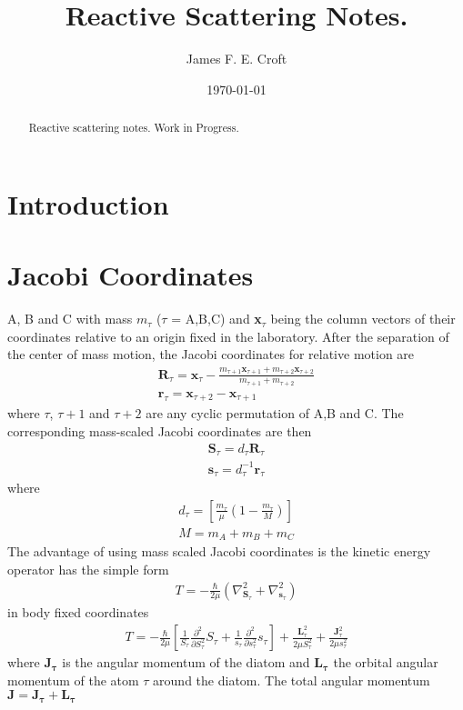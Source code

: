 \documentclass[aps,pra,onecolumn,showpacs,floatfix]{revtex4}
\begin{document}
\title{Reactive Scattering Notes.}
\author{James F. E. Croft}
\affiliation{\noaffiliation}

\date{\today}

\begin{abstract}
Reactive scattering notes. Work in Progress.
\end{abstract}

\pacs{}

\maketitle
%
\section{Introduction}
\section{Jacobi Coordinates}
A, B and C with mass $m_\tau$ ($\tau$ = A,B,C) and \textbf{x}$_\tau$ being the
column vectors of their coordinates relative to an origin fixed in the
laboratory. After the separation of the center of mass motion, the Jacobi
coordinates for relative motion are
\begin{align}\label{eqn:jac}
	\mathbf{R}_\tau = \mathbf{x}_
	\tau-\frac{m_{\tau+1} \mathbf{x}_{\tau+1}+m_{\tau+2} \mathbf{x}_{\tau+2}}{m_{\tau+1} + m_{\tau+2}} \\
	\mathbf{r}_\tau = \mathbf{x}_{\tau+2} - \mathbf{x}_{\tau+1}
\end{align}
where $\tau$, $\tau+1$ and $\tau+2$ are any cyclic permutation of A,B and C. The
corresponding mass-scaled Jacobi coordinates are then
\begin{align}\label{eqn:ms_jac}
	\mathbf{S}_\tau = d_\tau\mathbf{R}_\tau \\
	\mathbf{s}_\tau = d^{-1}_\tau\mathbf{r}_\tau
\end{align}
where
\begin{align}\label{eqn:ms_jac}
d_\tau = \left[\frac{m_\tau}{\mu}\left(1-\frac{m_\tau}{M}\right)\right] \\
M = m_A + m_B + m_C
\end{align}
The advantage of using mass scaled Jacobi coordinates is the kinetic energy
operator has the simple form
\begin{align}\label{eqn:ms_jac}
	T = -\frac{\hbar}{2\mu}(\nabla^2_{\mathbf{S}_\tau} + \nabla^2_{\mathbf{s}_\tau})
\end{align}
in body fixed coordinates
\begin{align}\label{eqn:ms_jac}
	T = -\frac{\hbar}{2\mu}\left[\frac{1}{S_\tau}\frac{\partial^2}{\partial S^2_\tau}S_\tau + \frac{1}{s_\tau}\frac{\partial^2}{\partial s^2_\tau}s_\tau\right] +
	\frac{\mathbf{L}^2_\tau}{2\mu S^2_\tau} + \frac{\mathbf{J}^2_\tau}{2\mu s^2_\tau}
\end{align}
where $\mathbf{J_\tau}$ is the angular momentum of the diatom  and
$\mathbf{L_\tau}$ the orbital angular momentum of the atom $\tau$ around the
diatom. The total angular momentum $\mathbf{J}=\mathbf{J_\tau}+\mathbf{L_\tau}$
\end{document}
